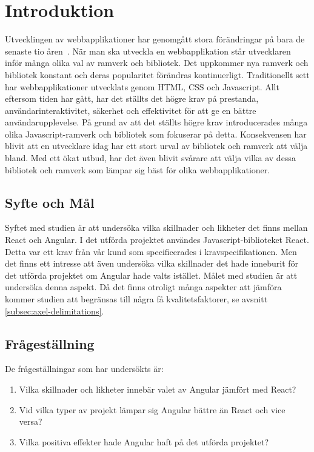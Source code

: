 \section{Introduktion}
\label{sec:axel-introduction}
Utvecklingen av webbapplikationer har genomgått stora förändringar på bara de senaste tio åren~\cite{changing}. När man ska utveckla en webbapplikation står utvecklaren inför många olika val av ramverk och bibliotek. Det uppkommer nya ramverk och bibliotek konstant och deras popularitet förändras kontinuerligt. Traditionellt sett har webbapplikationer utvecklats genom HTML, CSS och Javascript. Allt eftersom tiden har gått, har det ställts det högre krav på prestanda, användarinteraktivitet, säkerhet och effektivitet för att ge en bättre användarupplevelse. På grund av att det ställts högre krav introducerades många olika Javascript-ramverk och bibliotek som fokuserar på detta. Konsekvensen har blivit att en utvecklare idag har ett stort urval av bibliotek och ramverk att välja bland. Med ett ökat utbud, har det även blivit svårare att välja vilka av dessa bibliotek och ramverk som lämpar sig bäst för olika webbapplikationer.

\subsection{Syfte och Mål}
\label{subsec:axel-motivation}

Syftet med studien är att undersöka vilka skillnader och likheter det finns mellan React och Angular. I det utförda projektet användes Javascript-biblioteket React. Detta var ett krav från vår kund som specificerades i kravspecifikationen. Men det finns ett intresse att även undersöka vilka skillnader det hade inneburit för det utförda projektet om Angular hade valts istället. Målet med studien är att undersöka denna aspekt. Då det finns otroligt många aspekter att jämföra kommer studien att begränsas till några få kvalitetsfaktorer, se avsnitt \ref{subsec:axel-delimitations}.

\subsection{Frågeställning}
\label{subsec:axel-research-questions}

De frågeställningar som har undersökts är:

\begin{enumerate}
\item\label{axel-fs:1} Vilka skillnader och likheter innebär valet av Angular jämfört med React?

\item\label{axel-fs:2} Vid vilka typer av projekt lämpar sig Angular bättre än React och vice versa?

\item\label{axel-fs:3} Vilka positiva effekter hade Angular haft på det utförda projektet?


\end{enumerate}


